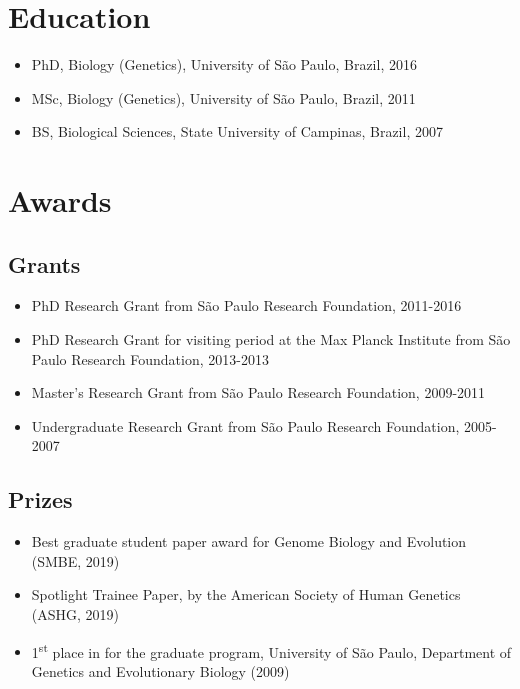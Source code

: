 \documentclass{article}
\begin{document}
 
\section{Education}

\begin{itemize}
\item PhD, Biology (Genetics), University of São Paulo, Brazil, 2016
\item MSc, Biology (Genetics), University of São Paulo, Brazil, 2011
\item BS, Biological Sciences, State University of Campinas, Brazil, 2007
\end{itemize}
 

\section{Awards}
\subsection{Grants}
\begin{itemize}
    \item PhD Research Grant from  São Paulo Research Foundation, 2011-2016
    \item PhD Research Grant for visiting period at the Max Planck Institute from São Paulo Research Foundation, 2013-2013
    \item Master’s Research Grant from São Paulo Research Foundation, 2009-2011
    \item Undergraduate Research Grant from São Paulo Research Foundation, 2005-2007
\end{itemize}
\subsection{Prizes}
\begin{itemize}
\item Best graduate student paper award for Genome Biology and Evolution (SMBE, 2019)
\item  Spotlight Trainee Paper, by the
American Society of Human Genetics (ASHG, 2019)
\item 1\textsuperscript{st} place in for the graduate program, University of São Paulo, Department of Genetics and Evolutionary Biology (2009)
\end{itemize}
\end{document}

